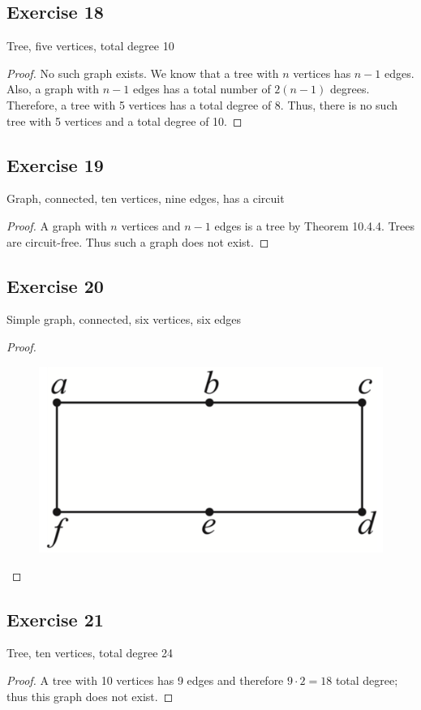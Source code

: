 \documentclass[14pt]{extarticle}
\begin{document}
\subsection{Exercise 18}
Tree, five vertices, total degree 10
\begin{proof}
No such graph exists. We know that a tree with \(n\) vertices has \(n-1\) edges. Also, a graph with \(n-1\) edges has a 
total number of \(2(n-1)\) degrees. Therefore, a tree with 5 vertices has a total degree of 8. Thus, there is no such tree 
with 5 vertices and a total degree of 10.
\end{proof}

\subsection{Exercise 19}
Graph, connected, ten vertices, nine edges, has a circuit
\begin{proof}
A graph with \(n\) vertices and \(n-1\) edges is a tree by Theorem 10.4.4. Trees are circuit-free. Thus such a graph does
not exist.
\end{proof}

\subsection{Exercise 20}
Simple graph, connected, six vertices, six edges
\begin{proof}
\begin{figure}[ht!]
\centering
\includegraphics[scale=0.1]{../images/10.4.20.png}
\end{figure}
\end{proof}

\subsection{Exercise 21}
Tree, ten vertices, total degree 24
\begin{proof}
A tree with 10 vertices has 9 edges and therefore \(9 \cdot 2 = 18\) total degree; thus this graph does not exist.
\end{proof}
\end{document}
